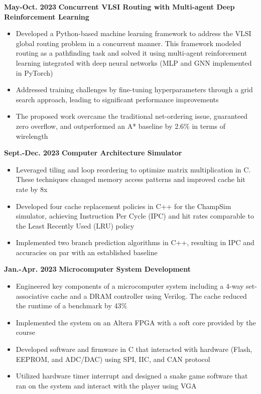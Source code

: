 \documentclass[11pt,a4paper,sans]{moderncv}
\begin{document}
\cventry
{\textnormal{\textbf{May-Oct. 2023}}}
{\textnormal{\textbf{Concurrent VLSI Routing with Multi-agent
Deep Reinforcement Learning}}}
{}{}{}
{
    \begin{itemize}
        \item Developed a Python-based machine learning framework to address the VLSI global routing problem in a concurrent manner. This framework modeled routing as a pathfinding task and solved it using multi-agent reinforcement learning integrated with deep neural networks (MLP and GNN implemented in PyTorch)
        \item Addressed training challenges by fine-tuning hyperparameters through a grid search approach, leading to significant performance improvements
        \item The proposed work overcame the traditional net-ordering issue, guaranteed zero overflow, and outperformed an A* baseline by 2.6\% in terms of wirelength
        \end{itemize}
}

\cventry
{\textnormal{\textbf{Sept.-Dec. 2023}}}
{\textnormal{\textbf{Computer Architecture Simulator}}}
{}{}{}
{
    \begin{itemize}
        \item Leveraged tiling and loop reordering to optimize matrix multiplication in C. These techniques changed memory access patterns and improved cache hit rate by 8x
        \item Developed four cache replacement policies in C++ for the ChampSim simulator, achieving Instruction Per Cycle (IPC) and hit rates comparable to the Least Recently Used (LRU) policy
        \item Implemented two branch prediction algorithms in C++, resulting in IPC and accuracies on par with an established baseline
    \end{itemize}
}

\cventry
{\textnormal{\textbf{Jan.-Apr. 2023}}}
{\textnormal{\textbf{Microcomputer System Development}}}
{}{}{}
{
    \begin{itemize}
    \item Engineered key components of a microcomputer system including a 4-way set-associative cache and a DRAM controller using Verilog. The cache reduced the runtime of a benchmark by 43\%
    \item Implemented the system on an Altera FPGA with a soft core provided by the course 
    \item Developed software and firmware in C that interacted with hardware (Flash, EEPROM, and ADC/DAC) using SPI, IIC, and CAN protocol 
    \item Utilized hardware timer interrupt and designed a snake game software that ran on the system and interact with the player using VGA
    \end{itemize}
}
\end{document}
